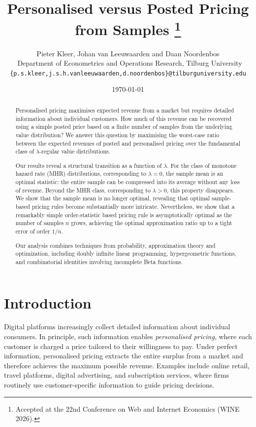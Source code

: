 \documentclass[11pt]{article}
\title{Personalised versus Posted Pricing from Samples%
    \thanks{Accepted at the 22nd Conference on Web and Internet Economics (WINE 2026).}}
\author{Pieter Kleer, Johan van Leeuwaarden and Daan Noordenbos\\\
Department of Econometrics and Operations Research, Tilburg University\\
\texttt{\{p.s.kleer,j.s.h.vanleeuwaarden,d.noordenbos\}@tilburguniversity.edu}}
\date{\today}
\begin{document}
\maketitle
\thispagestyle{empty}
\begin{abstract}
Personalised pricing maximises expected revenue from a market but requires detailed information about individual customers. How much of this revenue can be recovered using a simple posted price based on a finite number of samples from the underlying value distribution? We answer this question by maximising the worst-case ratio between the expected revenues of posted and personalised pricing over the fundamental class of $\lambda$-regular value distributions.

Our results reveal a structural transition as a function of $\lambda$. For the class of monotone hazard rate (MHR) distributions, corresponding to $\lambda = 0$, the sample mean is an optimal statistic: the entire sample can be compressed into its average without any loss of revenue. Beyond the MHR class, corresponding to $\lambda > 0$, this property disappears. We show that the sample mean is no longer optimal, revealing that optimal sample-based pricing rules become substantially more intricate. Nevertheless, we show that a remarkably simple order-statistic based pricing rule is asymptotically optimal as the number of samples $n$ grows, achieving the optimal approximation ratio up to a tight error of order $1/n$.

Our analysis combines techniques from probability, approximation theory and optimization, including doubly infinite linear programming, hypergeometric functions, and combinatorial identities involving incomplete Beta functions.
\end{abstract}

\newpage
{}
\setcounter{page}{1}  


\section{Introduction}
Digital platforms increasingly collect detailed information about individual consumers. In principle, such information enables \emph{personalised pricing}, where each customer is charged a price tailored to their willingness to pay. Under perfect information, personalised pricing extracts the entire surplus from a market and therefore achieves the maximum possible revenue. Examples include online retail, travel platforms, digital advertising, and subscription services, where firms routinely use customer-specific information to guide pricing decisions. 
\end{document}

